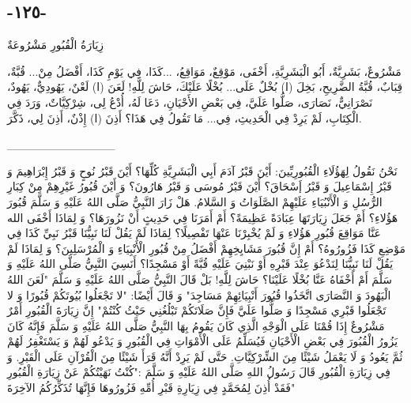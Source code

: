 \documentclass[a5paper]{article}
\begin{document}
\subsection{-١٢٥-}
زِيَارَةُ الْقُبُورِ مَشْرُوعَةٌ

مَشْرُوعٌ، بَشَرِيَّةٌ، أَبُو الْبَشَرِيَّةِ، أَخْفَى، مَوْقِعٌ، مَوَاقِعُ، ...كَذَا، فِي يَوْمِ كَذَا، أَفْضَلُ مِنْ... قُبَّةٌ، قِبَابٌ، قُبَّةُ الضَّرِيحِ، بَخِلَ (ا) بُخْلٌ عَلَى... بُخْلًا عَلَيْكَ، حَاشَ لِلَّهِ! لَعَنَ (ا) لَعْنٌ، يَهُودِيٌّ، يَهُودٌ، نَصْرَانِيٌّ، نَصَارَى، صَلُّوا عَلَيَّ، فِي بَعْضِ الأَحْيَانِ، دَعَا لَهُ، أُدْعُ لِى، شِرْكِيَّاتٌ، وَرَدَ فِي الْكِتَابِ، لَمْ يَرِدْ فِي الْحَدِيثِ، فِي... مَا تَقُولُ فِي هَذَا؟ أَذِنَ (ا) إِذْنٌ، أَذِنَ لِي، ذَكَّرَ.

\_\_\_\_\_\_\_\_\_\_\_\_\_

نَحْنُ نَقُولُ لِهَؤُلَاءِ الْقُبُورِيِّينَ: أَيْنَ قَبْرُ آدَمَ أَبِي الْبَشَرِيَّةِ كُلِّهَا؟ أَيْنَ قَبْرُ نُوحٍ وَ قَبْرُ إِبْرَاهِيمَ وَ قَبْرُ إِسْمَاعِيلَ وَ قَبْرُ إَسْحَاقَ؟ أَيْنَ قَبْرُ مُوسَى وَ قَبْرُ هَارُونَ؟ وَ أَيْنَ قُبُورُ غَيْرِهِمْ مِنْ كِبَارِ الرُّسُلِ وَ الْأَنْبُيَاءِ عَلَيْهِمْ الصَّلَوَاتُ وَ السَّلامُ. هَلْ زَارَ النَّبِيُّ صَلَّى اللهُ عَلَيْهِ وَ سَلَّمَ قُبُورَ هَؤُلاءِ؟ أَمْ جَعَلَ زِيَارَتَهَا عِبَادَةً عَظِيمَةً؟ أَمْ أَمَرَنَا فِي حَدِيثٍ أَنْ نَزُورَهَا؟ وَ لِمَاذَا أَخْفَى الله عَنَّا مَوَاقِعَ قُبُورِ هَؤُلاءِ وَ لَمْ يُخْبِرْنَا عَنْهَا تَفْصِيلًا؟ لِمَاذَا لَمْ يَقُلْ لَنَا نَبِيُّنَا قَبْرُ نَبِيِّ كَذَا فِي مَوْضِعِ كَذَا فَزُورُوهُ؟ أَمْ إِنَّ قُبُورَ مَشَايِخِهِمْ أَفْضَلُ مِنْ قُبُورِ الْأَنْبِيَاءِ وَ الْمُرْسَلِينَ؟ وَ لِمَاذَا لَمْ يَقُلْ لَنَا نَبِيُّنَا لِنَدْعُوَ عِنْدَ قَبْرِهِ أَوْ نَبْنِيَ عَلَيْهِ قُبَّةً أَوْ مَسْجِدًا؟ أَنَسِيَ النَّبِيُّ صَلَّى اللهُ عَلَيْهِ وَ سَلَّمَ أَمْ أَخْفَاهُ عَنَّا بُخْلًا عَلَيْنَا؟ حَاشَ لِلَّهِ! بَلْ قَالَ النَّبِيُّ صَلَّى اللهُ عَلَيْهِ وَ سَلَّمَ "لَعَنَ اللهُ الْيَهُودَ وَ النَّصَارَى اتَّخَذُوا قُبُورَ أَنْبِيَائِهِمْ مَسَاجِدَ" وَ قَالَ أَيْضًا: "لا تَجْعَلُوا بُيُوتَكُمْ قُبُورًا وَ لا تَجْعَلُوا قَبْرِي مَسْجِدًا وَ صَلُّوا عَلَيَّ فَإِنَّ صَلَاتَكُمْ تَبْلُغُنِي حَيْثُ كُنْتُمْ" إِنَّ زِيَارَةَ الْقُبُورِ أَمْرٌ مَشْرُوعٌ إِذَا قُمْنَا عَلَى الْوَجْهِ الَّذِي كَانَ يَقُومُ بِهَا النَّبِيُّ صَلَّى اللهُ عَلَيْهِ وَ سَلَّمَ فَإِنَّهُ كَانَ يَزُورُ الْقُبُورَ فِي بَعْضِ الْأَحْيَانِ فَيُسَلِّمُ عَلَى الْأَمْوَاتِ فِي الْقُبُورِ وَ يَدْعُو لَهُمْ وَ يَسْتَغْفِرُ لَهُمْ ثُمَّ يَعُودُ وَ لَا يَعْمَلُ شَيْئًا مِنَ الشِّرْكِيَّاتِ. حَتَّى لَمْ يَرِدْ أَنَّهُ قَرَأَ شَيْئًا مِنَ الْقُرْآنِ عَلَى الْقَبْرِ. وَ فِي زِيَارَةِ الْقُبُورِ قَالَ رَسُولُ اللهِ صَلَّى اللهُ عَلَيْهِ وَ سَلَّمَ :"كُنْتُ نَهَيْتُكُمْ عَنْ زِيَارَةِ الْقُبُورِ فَقَدْ أُذِنَ لِمُحَمَّدٍ فِي زِيَارِةِ قَبْرِ أُمِّهِ فَزُورُوهَا فَإِنَّهَا تُذَكِّرُكُمُ الآخِرَةَ"
\end{document}
